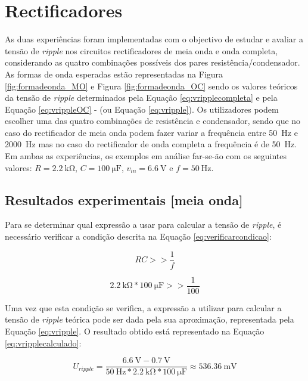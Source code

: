 \section{Rectificadores}
\label{sec:resultados_rectificadores}
As duas experiências foram implementadas com o objectivo de estudar e avaliar a tensão de \textit{ripple} nos circuitos rectificadores de meia onda e onda completa, considerando as quatro combinações possíveis dos pares resistência/condensador. As formas de onda esperadas estão representadas na Figura \ref{fig:formadeonda_MO} e Figura \ref{fig:formadeonda_OC} sendo os valores teóricos da tensão de \textit{ripple} determinados pela Equação \ref{eq:vripplecompleta} e pela Equação \ref{eq:vrippleOC} - (ou Equação \ref{eq:vripple}). Os utilizadores podem escolher uma das quatro combinações de resistência e condensador, sendo que no caso do rectificador de meia onda podem fazer variar a frequência entre \SI{50}{\hertz} e \SI{2000}{\hertz} mas no caso do rectificador de onda completa a frequência é de \SI{50}{\hertz}. Em ambas as experiências, os exemplos em análise far-se-ão com os seguintes valores: $R=\SI{2.2}{\kilo\ohm}$, $C=\SI{100}{\micro\farad}$, $v_{in}=\SI{6.6}{\volt}$ e $f=\SI{50}{\hertz}$.

\subsection{Resultados experimentais [meia onda]}
\label{sec:resultados_RectificadoresMeiaOnda}
Para se determinar qual expressão a usar para calcular a tensão de \textit{ripple}, é necessário verificar a condição descrita na Equação \ref{eq:verificarcondicao}:

\begin{equation} \label{eq:verificarcondicao}
	RC >> \dfrac{1}{f}
\end{equation}

\begin{equation}
	\SI{2.2}{\kilo\ohm} * \SI{100}{\micro\farad} >> \dfrac{1}{100}
\end{equation}

Uma vez que esta condição se verifica, a expressão a utilizar para calcular a tensão de \textit{ripple} teórica pode ser dada pela sua aproximação, representada pela Equação \ref{eq:vripple}. O resultado obtido está representado na Equação \ref{eq:vripplecalculado}:

\begin{equation} \label{eq:vripplecalculado}
	U_{ripple} = \frac{\SI{6.6}{\volt}-\SI{0.7}{\volt}}{\SI{50}{\hertz}*\SI{2.2}{\kilo\ohm}*\SI{100}{\micro\farad}} \approx \SI{536.36}{\milli\volt}
\end{equation}

